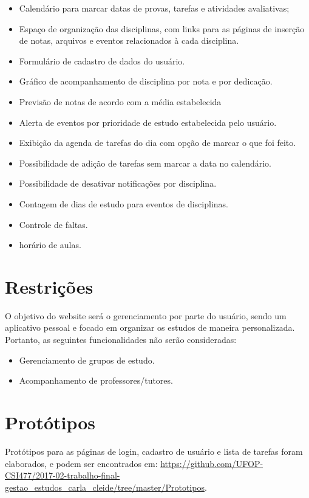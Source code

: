 \documentclass[10pt,a4paper,article]{abntex2}
\begin{document}
		\begin{itemize}
		    \item Calendário para marcar datas de provas, tarefas e atividades avaliativas;
		    \item Espaço de organização das disciplinas, com links para as páginas de inserção de notas, arquivos e eventos relacionados à cada disciplina.
		    \item Formulário de cadastro de dados do usuário.
		    \item Gráfico de acompanhamento de disciplina por nota e por dedicação.
		    \item Previsão de notas de acordo com a média estabelecida
		    \item Alerta de eventos por prioridade de estudo estabelecida pelo usuário.
		    \item Exibição da agenda de tarefas do dia com opção de marcar o que foi feito.
		    \item Possibilidade de adição de tarefas sem marcar a data no calendário.
		    \item Possibilidade de desativar notificações por disciplina.
		    \item Contagem de dias de estudo para eventos de disciplinas.
		    \item Controle de faltas.
		    \item horário de aulas.
		\end{itemize}

	\section{Restrições}

		O objetivo do website será o gerenciamento por parte do usuário, sendo um aplicativo pessoal e focado em organizar os estudos de maneira personalizada. Portanto, as seguintes funcionalidades não serão consideradas:
		
		\begin{itemize}
		    \item Gerenciamento de grupos de estudo.
		    \item Acompanhamento de professores/tutores.
		\end{itemize}

	\section{Protótipos}
		  Protótipos para as páginas de login, cadastro de usuário e lista de tarefas foram elaborados, e podem ser encontrados em: \url{https://github.com/UFOP-CSI477/2017-02-trabalho-final-gestao_estudos_carla_cleide/tree/master/Prototipos}.
		  
\end{document}
